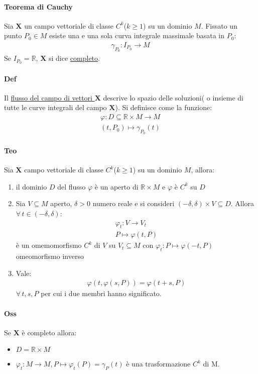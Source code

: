 \paragraph*{Teorema di Cauchy} Sia $\mathbf{X}$ un campo vettoriale di classe $C^k$($k\ge1$) su un dominio $M$.
Fissato un punto $P_0\in M$ esiste una e una sola curva integrale massimale basata in $P_0$:
\begin{align*}
    \gamma_{P_0}\colon I_{P_0}\to M
\end{align*}
Se $I_{P_0}=\mathbb{R}$, $\mathbf{X}$ si dice \underline{completo}.
\paragraph*{Def} Il \underline{flusso del campo di vettori $\mathbf{X}$} descrive lo spazio delle soluzioni( o insieme di tutte le curve integrali del campo $\mathbf{X}$).
Si definisce come la funzione:
\begin{align*}
    \varphi\colon D\subseteq \mathbb{R}\times M \to M\\
    (t,P_0)\mapsto \gamma_{P_0}(t)
\end{align*}
\paragraph*{Teo}Sia $\mathbf{X}$ campo vettoriale di classe $C^k$($k\ge1$) su un dominio $M$, allora:
\begin{enumerate}
    \item il dominio $D$ del flusso $\varphi$ è un aperto di $\mathbb{R}\times M$ e $\varphi$ è $C^k$ su $D$
    \item Sia $V\subseteq M$ aperto, $\delta >0$ numero reale e si consideri $(-\delta,\delta)\times V\subseteq D$. Allora $\forall \, t \in (-\delta,\delta)$:
    \begin{align*}
       \varphi_t\colon V\to V_t\\
       P\mapsto \varphi(t,P) 
    \end{align*}
    è un omemomorfismo $C^k$ di $V$ su $V_t\subseteq M$ con $\varphi_t\colon P\mapsto\varphi(-t,P)$ omeomorfismo inverso
    \item Vale:
    \begin{align*}
      \varphi(t,\varphi(s,P))=\varphi(t+s,P)  
    \end{align*}
    $\forall\, t,s,P$ per cui i due membri hanno significato.
\end{enumerate}
\paragraph*{Oss}Se $\mathbf{X}$ è completo allora:
\begin{itemize}
    \item $D=\mathbb{R}\times M$
    \item $\varphi_t\colon M\to M,P\mapsto\varphi_t(P)=\gamma_P(t)$ è una trasformazione $C^k$ di M.
\end{itemize}
